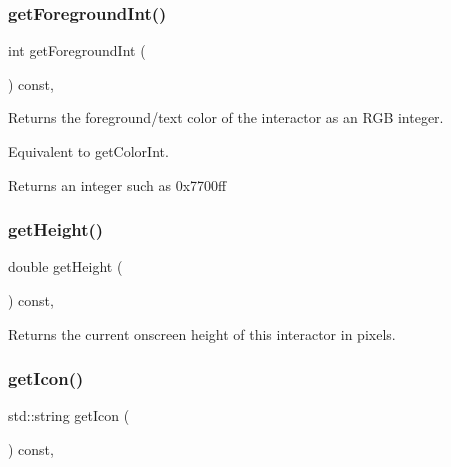\subsubsection{\texorpdfstring{get\+Foreground\+Int()}{getForegroundInt()}}
{\footnotesize\ttfamily int get\+Foreground\+Int (\begin{DoxyParamCaption}{ }\end{DoxyParamCaption}) const\hspace{0.3cm}{\ttfamily [virtual]}, {\ttfamily [inherited]}}



Returns the foreground/text color of the interactor as an R\+GB integer. 

Equivalent to get\+Color\+Int. \begin{DoxyReturn}{Returns}
an integer such as 0x7700ff 
\end{DoxyReturn}
\mbox{\label{classsgl_1_1GInteractor_a1e7e353362434072875264cf95629f99}} 
\subsubsection{\texorpdfstring{get\+Height()}{getHeight()}}
{\footnotesize\ttfamily double get\+Height (\begin{DoxyParamCaption}{ }\end{DoxyParamCaption}) const\hspace{0.3cm}{\ttfamily [virtual]}, {\ttfamily [inherited]}}



Returns the current onscreen height of this interactor in pixels. 

\mbox{\label{classsgl_1_1GInteractor_aaed62a73004939a64da6f0eb9eb64d73}} 
\subsubsection{\texorpdfstring{get\+Icon()}{getIcon()}}
{\footnotesize\ttfamily std\+::string get\+Icon (\begin{DoxyParamCaption}{ }\end{DoxyParamCaption}) const\hspace{0.3cm}{\ttfamily [virtual]}, {\ttfamily [inherited]}}



